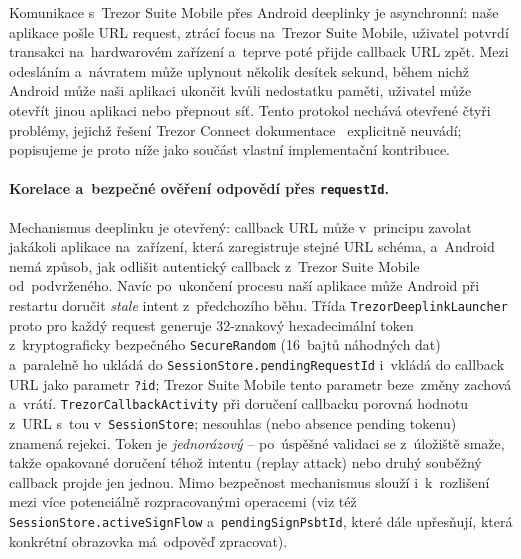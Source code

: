 Komunikace s~Trezor Suite Mobile přes Android deeplinky je asynchronní:
naše aplikace pošle URL request, ztrácí focus na~Trezor Suite Mobile,
uživatel potvrdí transakci na~hardwarovém zařízení a~teprve poté přijde
callback URL zpět. Mezi odesláním a~návratem může uplynout několik desítek
sekund, během nichž Android může naši aplikaci ukončit kvůli nedostatku
paměti, uživatel může otevřít jinou aplikaci nebo přepnout síť. Tento
protokol nechává otevřené čtyři problémy, jejichž řešení Trezor Connect
dokumentace~\cite{TrezorConnect} explicitně neuvádí; popisujeme je proto
níže jako součást vlastní implementační kontribuce.

\paragraph{Korelace a~bezpečné ověření odpovědí přes
\texttt{requestId}.}
Mechanismus deeplinku je otevřený: callback URL může v~principu zavolat
jakákoli aplikace na~zařízení, která zaregistruje stejné URL schéma,
a~Android nemá způsob, jak odlišit autentický callback z~Trezor Suite
Mobile od~podvrženého. Navíc po~ukončení procesu naší aplikace může
Android při restartu doručit \emph{stale} intent z~předchozího běhu.
Třída \texttt{TrezorDeeplinkLauncher} proto pro každý request generuje
32-znakový hexadecimální token z~kryptograficky bezpečného
\texttt{SecureRandom} (16~bajtů náhodných dat) a~paralelně ho ukládá
do \texttt{Session\allowbreak Store.\allowbreak pendingRequestId}
i~vkládá do callback URL jako parametr \texttt{?id};
Trezor Suite Mobile tento parametr beze~změny zachová a~vrátí.
\texttt{TrezorCallbackActivity} při doručení callbacku porovná
hodnotu z~URL s~tou v~\texttt{Session\allowbreak Store};
nesouhlas (nebo absence pending tokenu) znamená rejekci.
Token je \emph{jednorázový} -- po~úspěšné validaci se z~úložiště smaže,
takže opakované doručení téhož intentu (replay attack) nebo druhý
souběžný callback projde jen jednou. Mimo bezpečnost mechanismus
slouží i~k~rozlišení mezi více potenciálně rozpracovanými operacemi
(viz též \texttt{Session\allowbreak Store.\allowbreak active\-Sign\-Flow}
a~\texttt{pendingSign\-PsbtId}, které dále upřesňují, která konkrétní
obrazovka má~odpověď zpracovat).

